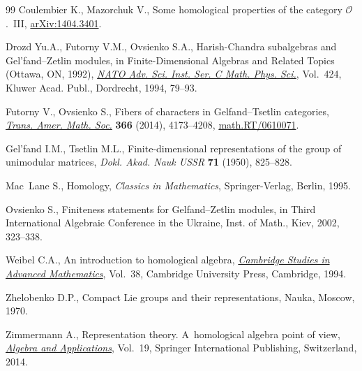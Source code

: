 \documentclass[11pt]{article}
\begin{document}
\begin{thebibliography}{99}
Coulembier K., Mazorchuk V., Some homological properties of the category
  {${\mathcal O}$}.~{III}, \href{http://arxiv.org/abs/1404.3401}{arXiv:1404.3401}.

Drozd Yu.A., Futorny V.M., Ovsienko S.A., Harish-{C}handra subalgebras and
  {G}el'fand--{Z}etlin modules, in Finite-Dimensional Algebras and Related
  Topics ({O}ttawa, {ON}, 1992), \href{http://dx.doi.org/10.1007/978-94-017-1556-0_5}{\textit{NATO Adv. Sci. Inst. Ser. C Math.
  Phys. Sci.}}, Vol.~424, Kluwer Acad. Publ., Dordrecht, 1994, 79--93.

Futorny V., Ovsienko S., Fibers of characters in {G}elfand--{T}setlin
  categories, \href{http://dx.doi.org/10.1090/S0002-9947-2014-05938-2}{\textit{Trans. Amer. Math. Soc.}} \textbf{366} (2014), 4173--4208,
  \href{http://arxiv.org/abs/math.RT/0610071}{math.RT/0610071}.

Gel'fand I.M., Tsetlin M.L., Finite-dimensional representations of the group of
  unimodular matrices, \textit{Dokl. Akad. Nauk USSR} \textbf{71} (1950),
  825--828.

Mac~Lane S., Homology, \textit{Classics in Mathematics}, Springer-Verlag, Berlin, 1995.

Ovsienko S., Finiteness statements for {G}elfand--{Z}etlin modules, in Third
  {I}nternational {A}lgebraic {C}onference in the {U}kraine, Inst. of Math.,
  Kiev, 2002, 323--338.

Weibel C.A., An introduction to homological algebra, \href{http://dx.doi.org/10.1017/CBO9781139644136}{\textit{Cambridge Studies
  in Advanced Mathematics}}, Vol.~38, Cambridge University Press, Cambridge,
  1994.

Zhelobenko D.P., Compact Lie groups and their representations, Nauka, Moscow,
  1970.

Zimmermann A., Representation theory. A~homological algebra point of view,
  \href{http://dx.doi.org/10.1007/978-3-319-07968-4}{\textit{Algebra and Applications}}, Vol.~19, Springer International
  Publishing, Switzerland, 2014.

\end{thebibliography}
\end{document}
